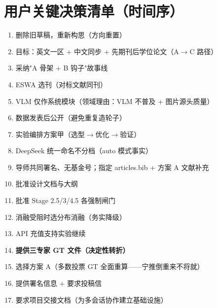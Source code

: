 \documentclass[11pt]{article}
\begin{document}
\section{{\cjkfont 用户关键决策清单（时间序）}}
\begin{enumerate}
\item {\cjkfont 删除旧草稿，重新构思（方向重置）}
\item {\cjkfont 目标：英文一区} + {\cjkfont 中文同步} + {\cjkfont 先期刊后学位论文（}A$\rightarrow$C {\cjkfont 路径）}
\item {\cjkfont 采纳}"A {\cjkfont 骨架} + B {\cjkfont 钩子}"{\cjkfont 故事线}
\item ESWA {\cjkfont 选刊（对标文献同刊）}
\item VLM {\cjkfont 仅作系统模块（领域理由：}VLM {\cjkfont 不普及} + {\cjkfont 图片源头质量）}
\item {\cjkfont 数据发表后公开（避免重复造轮子）}
\item {\cjkfont 实验编排方案甲（选型}$\rightarrow${\cjkfont 优化}$\rightarrow${\cjkfont 验证）}
\item DeepSeek {\cjkfont 统一命名不分档（}auto {\cjkfont 模式事实）}
\item {\cjkfont 导师共同署名、无基金号；指定} articles.bib + {\cjkfont 方案} A {\cjkfont 文献补充}
\item {\cjkfont 批准设计文档与大纲}
\item {\cjkfont 批准} Stage 2.5/3/4.5 {\cjkfont 各强制闸门}
\item {\cjkfont 消融受阻时选分布消融（务实降级）}
\item API {\cjkfont 充值支持实验继续}
\item \textbf{{\cjkfont 提供三专家} GT {\cjkfont 文件（决定性转折）}}
\item {\cjkfont 选择方案} A{\cjkfont （多数投票} GT {\cjkfont 全面重算}------{\cjkfont 宁推倒重来不将就）}
\item {\cjkfont 提供署名信息} + {\cjkfont 要求投稿信}
\item {\cjkfont 要求项目交接文档（为多会话协作建立基础设施）}
\end{enumerate}
\end{document}
